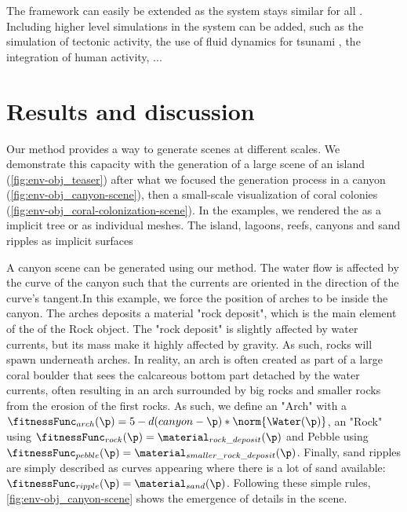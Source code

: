 The framework can easily be extended as the  system stays similar for all . Including higher level simulations in the  system can be added, such as the simulation of tectonic activity, the use of fluid dynamics for tsunami , the integration of human activity, ...

\section{Results and discussion}
\label{sec:env-obj_results}
Our method provides a way to generate scenes at different scales. We demonstrate this capacity with the generation of a large scene of an island (\cref{fig:env-obj_teaser}) after what we focused the generation process in a canyon (\cref{fig:env-obj_canyon-scene}), then a small-scale visualization of coral colonies (\cref{fig:env-obj_coral-colonization-scene}).
In the examples, we rendered the  as a implicit tree or as individual meshes. The island, lagoons, reefs, canyons and sand ripples as implicit surfaces

A canyon scene can be generated using our method. The water flow is affected by the curve of the canyon such that the currents are oriented in the direction of the curve's tangent.In this example, we force the position of arches to be inside the canyon. The arches deposits a material "rock deposit", which is the main element of the  of the Rock object. The "rock deposit" is slightly affected by water currents, but its mass make it highly affected by gravity. As such, rocks will spawn underneath arches. In reality, an arch is often created as part of a large coral boulder that sees the calcareous bottom part detached by the water currents, often resulting in an arch surrounded by big rocks and smaller rocks from the erosion of the first rocks.
As such, we define an  "Arch" with a  $\fitnessFunc_{arch}(\p) = 5 - d(canyon - \p) * \norm{\Water(\p)}$, an  "Rock" using $\fitnessFunc_{rock}(\p) = \material_{rock\_deposit}(\p)$ and Pebble using $\fitnessFunc_{pebble}(\p) = \material_{smaller\_rock\_deposit}(\p)$. Finally, sand ripples are simply described as curves appearing where there is a lot of sand available: $\fitnessFunc_{ripple}(\p) = \material_{sand}(\p)$.
Following these simple rules, \cref{fig:env-obj_canyon-scene} shows the emergence of details in the scene. 

